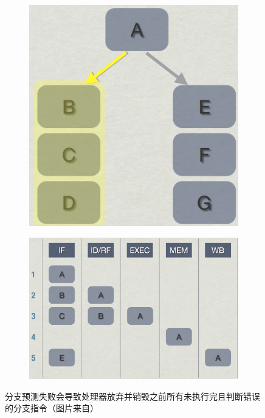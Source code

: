 \begin{figure}
	\begin{subfigure}[b]{0.382\textwidth}
		\includegraphics[width=1.\textwidth]{figures/rp/mispredict}
	\end{subfigure}
	\begin{subfigure}[b]{0.6\textwidth}
		\includegraphics[width=1.\textwidth]{figures/rp/mispredict-2}
	\end{subfigure}
\caption{分支预测失败会导致处理器放弃并销毁之前所有未执行完且判断错误的分支指令（图片来自\cite{a:DoggedDetermination:TechnologyandProcessatNaughtyDogInc.}）}
\label{f:rp-mispredict}
\end{figure}

